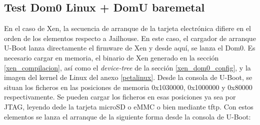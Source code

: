 \subsection{Test Dom0 Linux + DomU baremetal} \label{section:text_xen}

En el caso de Xen, la secuencia de arranque de la tarjeta electrónica difiere en el orden de los elementos respecto a Jailhouse. En este caso, el cargador de arranque U-Boot lanza directamente el firmware de Xen y desde aquí, se lanza el Dom0. Es necesario cargar en memoria, el binario de Xen generado en la sección \ref{xen_compilacion}, así como el \textit{device-tree} de la sección \ref{xen_dom0_config}, y la imagen del kernel de Linux del anexo \ref{petalinux}. Desde la consola de U-Boot, se situan los ficheros en las posiciones de memoria 0x1030000, 0x1000000 y 0x80000 respectivamente. Se pueden cargar los ficheros en esas posiciones ya sea por \acrshort{JTAG}, leyendo dede la tarjeta microSD o \acrshort{eMMC} o bien mediante tftp.
Con estos elementos se lanza el arranque de la siguiente forma desde la consola de U-Boot:

\begin{lstlisting}[style=CStyle]

\end{lstlisting}
